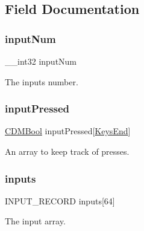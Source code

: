 \subsection{Field Documentation}
\mbox{\label{struct_c_d_m_event_a8710349fb6cd8007331d453943ee67bc}} 
\subsubsection{\texorpdfstring{input\+Num}{inputNum}}
{\footnotesize\ttfamily \+\_\+\+\_\+int32 input\+Num}



The inputs number. 

\mbox{\label{struct_c_d_m_event_a0a068f50666a0d8b50e12592c39e7b25}} 
\subsubsection{\texorpdfstring{input\+Pressed}{inputPressed}}
{\footnotesize\ttfamily \mbox{\hyperlink{_c_d_m_8h_af5296d3141c193195e69417d1825228b}{C\+D\+M\+Bool}} input\+Pressed\mbox{[}\mbox{\hyperlink{_c_d_m_8h_a8e7d3f25fc77053719b079b29784115fa1a4729fd774e28757eb8b774f4866422}{Keys\+End}}\mbox{]}}



An array to keep track of presses. 

\mbox{\label{struct_c_d_m_event_aa410219eafdce1e5eddb4770d9e84288}} 
\subsubsection{\texorpdfstring{inputs}{inputs}}
{\footnotesize\ttfamily I\+N\+P\+U\+T\+\_\+\+R\+E\+C\+O\+RD inputs\mbox{[}64\mbox{]}}



The input array. 

